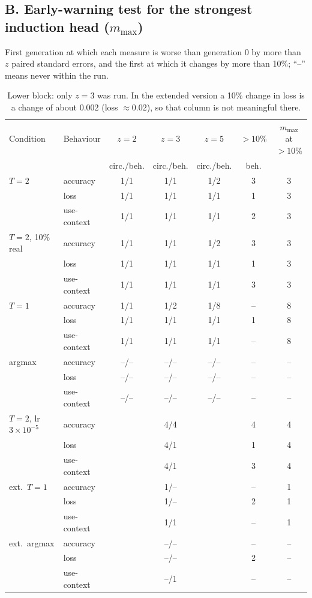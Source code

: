 \subsection*{B. Early-warning test for the strongest induction head ($m_{\max}$)}
First generation at which each measure is worse than generation 0 by more than $z$ paired standard
errors, and the first at which it changes by more than 10\%; ``--'' means never within the run.
\begin{table}[H]\centering\small
\begin{tabular}{llccccc}\toprule
Condition & Behaviour & $z{=}2$ & $z{=}3$ & $z{=}5$ & $>10\%$ & $m_{\max}$ at $>10\%$\\
 & & circ./beh. & circ./beh. & circ./beh. & beh. & \\\midrule
$T{=}2$ & accuracy & 1/1 & 1/1 & 1/2 & 3 & 3\\
 & loss & 1/1 & 1/1 & 1/1 & 1 & 3\\
 & use-context & 1/1 & 1/1 & 1/1 & 2 & 3\\
\midrule
$T{=}2$, 10\% real & accuracy & 1/1 & 1/1 & 1/2 & 3 & 3\\
 & loss & 1/1 & 1/1 & 1/1 & 1 & 3\\
 & use-context & 1/1 & 1/1 & 1/1 & 3 & 3\\
\midrule
$T{=}1$ & accuracy & 1/1 & 1/2 & 1/8 & -- & 8\\
 & loss & 1/1 & 1/1 & 1/1 & 1 & 8\\
 & use-context & 1/1 & 1/1 & 1/1 & -- & 8\\
\midrule
argmax & accuracy & --/-- & --/-- & --/-- & -- & --\\
 & loss & --/-- & --/-- & --/-- & -- & --\\
 & use-context & --/-- & --/-- & --/-- & -- & --\\
\midrule
$T{=}2$, lr $3{\times}10^{-5}$ & accuracy & & 4/4 & & 4 & 4\\
 & loss & & 4/1 & & 1 & 4\\
 & use-context & & 4/1 & & 3 & 4\\
\midrule
ext.\ $T{=}1$ & accuracy & & 1/-- & & -- & 1\\
 & loss & & 1/-- & & 2 & 1\\
 & use-context & & 1/1 & & -- & 1\\
\midrule
ext.\ argmax & accuracy & & --/-- & & -- & --\\
 & loss & & --/-- & & 2 & --\\
 & use-context & & --/1 & & -- & --\\
\bottomrule\end{tabular}
\caption{Lower block: only $z{=}3$ was run. In the extended version a 10\% change in loss is a change of
about 0.002 (loss $\approx0.02$), so that column is not meaningful there.}
\end{table}

